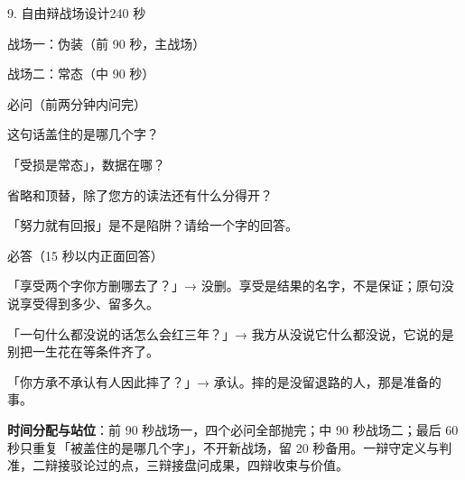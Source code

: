 \documentclass[script,con]{debate}
\begin{document}
\begin{stage}{9. 自由辩战场设计}{240 秒}
\begin{battleground}{战场一：伪装（前 90 秒，主战场）}
\begin{fields}
\end{fields}
\end{battleground}
\begin{battleground}{战场二：常态（中 90 秒）}
\begin{fields}
\end{fields}
\end{battleground}
\begin{points}{必问（前两分钟内问完）}
\item 这句话盖住的是哪几个字？
\item 「受损是常态」，数据在哪？
\item 省略和顶替，除了您方的读法还有什么分得开？
\item 「努力就有回报」是不是陷阱？请给一个字的回答。
\end{points}
\begin{points}{必答（15 秒以内正面回答）}
\item 「享受两个字你方删哪去了？」→ 没删。享受是结果的名字，不是保证；原句没说享受得到多少、留多久。
\item 「一句什么都没说的话怎么会红三年？」→ 我方从没说它什么都没说，它说的是别把一生花在等条件齐了。
\item 「你方承不承认有人因此摔了？」→ 承认。摔的是没留退路的人，那是准备的事。
\end{points}
\textbf{时间分配与站位}：前 90 秒战场一，四个必问全部抛完；中 90 秒战场二；最后 60 秒只重复「被盖住的是哪几个字」，不开新战场，留 20 秒备用。一辩守定义与判准，二辩接驳论过的点，三辩接盘问成果，四辩收束与价值。
\end{stage}
\end{document}
